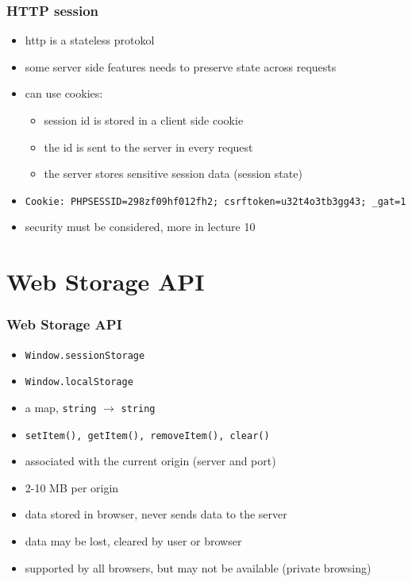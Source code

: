 \begin{frame}[fragile]\frametitle{HTTP session}
\color{structure}
\begin{itemize}\color{structure}
  \item http is a stateless protokol
  \item some server side features needs to preserve state across requests
  \item can use cookies:
  \begin{itemize}
    \item session id is stored in a client side cookie
    \item the id is sent to the server in every request
    \item the server stores sensitive session data (session state)
  \end{itemize}
  \item \texttt{Cookie: PHPSESSID=298zf09hf012fh2; csrftoken=u32t4o3tb3gg43; \_gat=1}
  \item security must be considered, more in lecture 10
\end{itemize}
\end{frame}

\section{Web Storage API}
\begin{frame}[fragile]\frametitle{Web Storage API}
\color{structure}

\begin{itemize}\color{structure}
  \item \texttt{Window.sessionStorage}
  \item \texttt{Window.localStorage}
  \item a map, \texttt{string} $\rightarrow$ \texttt{string}
  \item \texttt{setItem(), getItem(), removeItem(), clear()}
  \item associated with the current origin (server and port)
  \item 2-10 MB per origin
  \item data stored in browser, never sends data to the server
  \item data may be lost, cleared by user or browser
  \item supported by all browsers, but may not be available (private browsing)
\end{itemize}
\end{frame}

